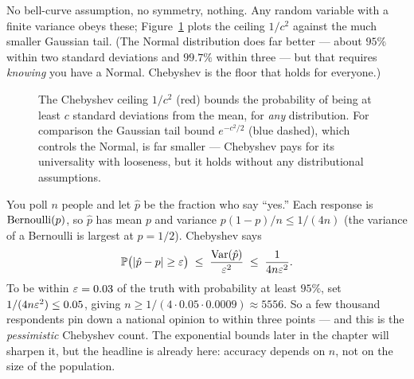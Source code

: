 No bell-curve assumption, no symmetry, nothing. Any random variable with a
finite variance obeys these; Figure~\ref{ch19:fig-cheb} plots the ceiling
$1/c^2$ against the much smaller Gaussian tail. (The Normal distribution does far better ---
about $95\%$ within two standard deviations and $99.7\%$ within three --- but
that requires \emph{knowing} you have a Normal. Chebyshev is the floor that
holds for everyone.)

\begin{figure}[H]
\centering
{}
\caption{The Chebyshev ceiling $1/c^2$ (red) bounds the probability of being
at least $c$ standard deviations from the mean, for \emph{any} distribution.
For comparison the Gaussian tail bound $e^{-c^2/2}$ (blue dashed), which
controls the Normal, is far smaller --- Chebyshev pays for its universality
with looseness, but it holds without any distributional assumptions.}
\label{ch19:fig-cheb}
\end{figure}

\begin{example}
\label{ch19:ex-poll}
You poll $n$ people and let $\hat p$ be the fraction who say ``yes.'' Each
response is $\operatorname{Bernoulli}(p)$, so $\hat p$ has mean $p$ and variance
$p(1-p)/n \le 1/(4n)$ (the variance of a Bernoulli is largest at $p=1/2$).
Chebyshev says
\[
  \operatorname{\mathbb{P}}\bigl(\lvert\hat p - p\rvert \ge \varepsilon\bigr)
  \;\le\; \frac{\operatorname{Var}(\hat p)}{\varepsilon^2}
  \;\le\; \frac{1}{4n\varepsilon^2}.
\]
To be within $\varepsilon = 0.03$ of the truth with probability at least $95\%$, set
$1/(4n\varepsilon^2) \le 0.05$, giving $n \ge 1/(4\cdot 0.05 \cdot 0.0009) \approx
5556$. So a few thousand respondents pin down a national opinion to within
three points --- and this is the \emph{pessimistic} Chebyshev count. The
exponential bounds later in the chapter will sharpen it, but the headline is
already here: accuracy depends on $n$, not on the size of the population.
\end{example}

